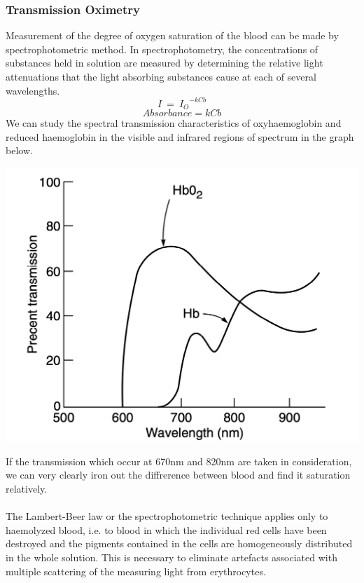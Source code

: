 \documentclass{article}
\begin{document}
\subsubsection{Transmission Oximetry}
Measurement of the degree of oxygen saturation of the blood can be made by spectrophotometric method. In spectrophotometry, the concentrations of substances held in solution are measured by determining the relative light attenuations that the light absorbing substances cause at each of several wavelengths. 
\begin{equation}
    I\: = \: {I_O}^{-kCb}
\end{equation}
\begin{equation}
    Absorbance = kCb
\end{equation}
We can study the spectral transmission characteristics of oxyhaemoglobin and reduced haemoglobin in the visible and infrared regions of spectrum in the graph below.
\begin{center}
    \includegraphics[scale=0.4]{Screenshot 2023-05-04 at 6.00.01 PM.png}
\end{center}
If the transmission which occur at 670nm and 820nm are taken in consideration, we can very clearly iron out the diffrerence between blood and find it saturation relatively.\\
\\
The Lambert-Beer law or the spectrophotometric technique applies only to haemolyzed blood, i.e. to blood in which the individual red cells have been destroyed and the pigments contained in the cells are homogeneously distributed in the whole solution. This is necessary to eliminate artefacts associated with multiple scattering of the measuring light from erythrocytes. 
\end{document}
